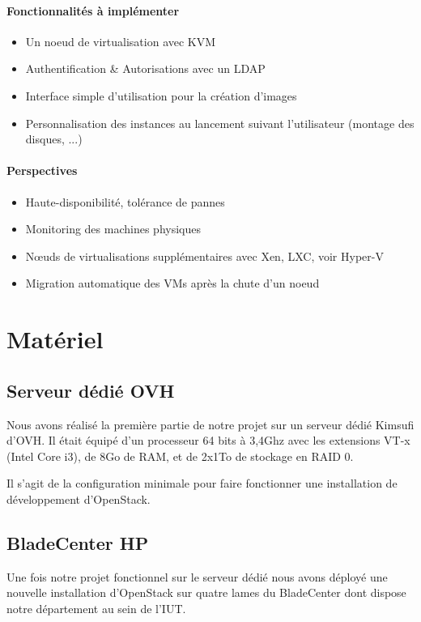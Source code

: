 \documentclass[a4paper,oneside]{report}
\begin{document}
\subsubsection{Fonctionnalités à implémenter}
\begin{itemize}
\item Un noeud de \gls{virtualisation} avec KVM
\item Authentification \& Autorisations avec un LDAP
\item Interface simple d'utilisation pour la création d'images
\item Personnalisation des instances au lancement suivant l'utilisateur (montage des disques, ...)
\end{itemize}

\subsubsection{Perspectives}
\begin{itemize}
\item Haute-disponibilité, tolérance de pannes
\item Monitoring des machines physiques
\item Nœuds de \gls{virtualisation}s supplémentaires avec Xen, LXC, voir Hyper-V
\item Migration automatique des VMs après la chute d'un noeud
\end{itemize}


\chapter{Matériel}

\section{Serveur dédié OVH}
Nous avons réalisé la première partie de notre projet sur un serveur dédié Kimsufi d'OVH.
Il était équipé d'un processeur 64 bits à 3,4Ghz avec les extensions VT-x (Intel Core i3), de 8Go de RAM, et de 2x1To de stockage en RAID 0.

Il s'agit de la configuration minimale pour faire fonctionner une installation de développement d'OpenStack.

\section{BladeCenter HP}
Une fois notre projet fonctionnel sur le serveur dédié nous avons déployé une nouvelle installation d'OpenStack sur quatre lames du BladeCenter dont dispose notre département au sein de l'IUT.
\end{document}
